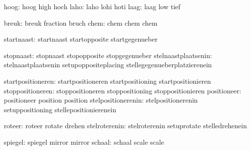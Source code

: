                          hoog:  hoog                         high
                                hoch
                         laho:  laho                         lohi
                                hoti
                         laag:  laag                         low
                                tief


                        breuk:  breuk                        fraction
                                bruch
                         chem:  chem                         chem
                                chem

                   startnaast:  startnaast                   startopposite
                                startgegenueber

                    stopnaast:  stopnaast                    stopopposite
                                stopgegenueber
          stelnaastplaatsenin:  stelnaastplaatsenin          setupoppositeplacing
                                stellegegenueberplatzierenein

            startpositioneren:  startpositioneren            startpositioning
                                startpositionieren
             stoppositioneren:  stoppositioneren             stoppositioning
                                stoppositionieren
                  positioneer:  positioneer                  position
                                position
           stelpositionerenin:  stelpositionerenin           setuppositioning
                                stellepositionierenein

                       roteer:  roteer                       rotate
                                drehen
                stelroterenin:  stelroterenin                setuprotate
                                stelledrehenein

                      spiegel:  spiegel                      mirror
                                mirror %
                       schaal:  schaal                       scale
                                scale  %

